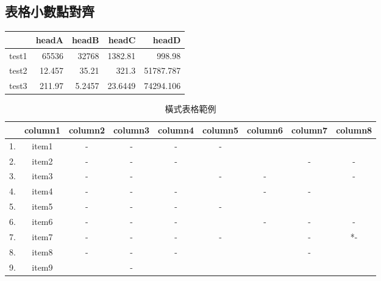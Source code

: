 \subsection{表格小數點對齊}
\begin{tabular}{lD{.}{.}{3}D{.}{.}{3}D{.}{.}{3}D{.}{.}{3}}
   \toprule
         & headA & headB & headC & headD \\
   \midrule
   test1 & 65536  & 32768 & 1382.81 & 998.98 \\
   test2 & 12.457 & 35.21 & 321.3   & 51787.787 \\
   test3 & 211.97 & 5.2457& 23.6449 & 74294.106 \\
   \bottomrule
\end{tabular}


\begin{landscape}
   \begin{table}[h]
   \caption{橫式表格範例}
   \label{Tab:Commercial_App_Features_Comparison}
   \begin{center}               
   \begin{tabular}{|c|c|c|c|c|c|c|c|c|}
   \hline
      & column1  & column2  & column3 & column4 & column5 & column6 & column7 & column8 \\ \hline
   1. & item1    & -        & -       & -       & -       &     \color{red}{${\surd}$} &  \color{red}{${\surd}$}    &  \color{red}{${\surd}$}     \\ \hline
   2. & item2    & -        & -       & -       & \color{red}{${\surd}$}      & \color{red}{${\surd}$}     & -    & -     \\ \hline
   3. & item3    & -        & -       & \color{red}{${\surd}$} & -     &  -    &  \color{red}{${\surd}$}    & -     \\ \hline
   4. & item4    & -        & -       & -       &  \color{red}{${\surd}$}     &  -    & -    &      \color{red}{${\surd}$} \\ \hline
   5. & item5    & -        & -       & -       &  -   &    \color{red}{${\surd}$}  &  \color{red}{${\surd}$}    &  \color{red}{${\surd}$}     \\ \hline
   6. & item6    & -        & -       & -       &  \color{red}{${\surd}$}   &  -    & -    &      - \\ \hline
   7. & item7    & -        & -       & -       &  -     &  \color{red}{${\surd}$}    & -    &     *- \\ \hline
   8. & item8    & -        & -       & -       &   \color{red}{${\surd}$}    &   \color{red}{${\surd}$}   & -    &      \color{red}{${\surd}$} \\ \hline
   9. & item9    &  \color{red}{${\surd}$}    &  -    & \color{red}{${\surd}$}                  &   \color{red}{${\surd}$}    &   \color{red}{${\surd}$}   &  \color{red}{${\surd}$}    &  \color{red}{${\surd}$}     \\ \hline
   \end{tabular}
   \end{center}
   \end{table}
\end{landscape}
\clearpage

